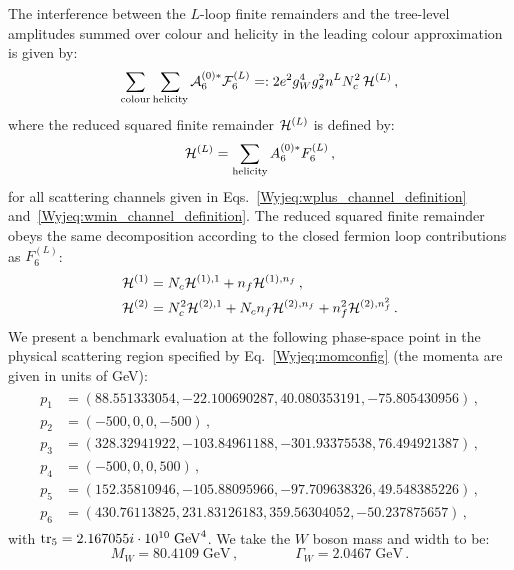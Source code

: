 \documentclass[main.tex]{subfiles}
\begin{document}
The interference between the $L$-loop finite remainders and the tree-level amplitudes summed over colour and helicity in the leading colour approximation is given by:
\begin{equation}
\sum_{\mathrm{colour}}\sum_{\mathrm{helicity}} \mathcal{A}_6^{(0)*} \mathcal{F}_6^{(L)} =: 2 e^2 g_W^4 g_s^2 n^L N_c^2 \, \mathcal{H}^{(L)} \,,
\end{equation}
where the reduced squared finite remainder $\mathcal{H}^{(L)}$ is defined by:
\begin{equation}
\mathcal{H}^{(L)} = \sum_{\mathrm{helicity}}  A_{6}^{(0)*}  F_{6}^{(L)} \,,
\end{equation}
for all scattering channels given in Eqs.~\eqref{Wyjeq:wplus_channel_definition} and~\eqref{Wyjeq:wmin_channel_definition}. 
The reduced squared finite remainder obeys the same decomposition according to the closed fermion loop contributions as $F_{6}^{(L)}$:
\begin{align} \label{Wyjeq:NfDecompositionH} 
\begin{aligned}
& \mathcal{H}^{(1)} = N_c \mathcal{H}^{(1),1} + n_f \mathcal{H}^{(1),n_f} \,, \\
& \mathcal{H}^{(2)} = N_c^2 \mathcal{H}^{(2),1} + N_c n_f \mathcal{H}^{(2),n_f} + n_f^2 \mathcal{H}^{(2),n_f^2} \,.
\end{aligned}
\end{align}
We present a benchmark evaluation at the following phase-space point in the physical scattering region specified by Eq.~\ref{Wyjeq:momconfig} (the momenta are given in units of GeV):
\begin{align}
\label{Wyjeq:PSpoint}
\begin{aligned}
p_1 & = (88.551333054, -22.100690287, 40.080353191, -75.805430956) \,, \\
p_2 & = (-500,0,0,-500) \,,  \\
p_3 & = (328.32941922, -103.84961188, -301.93375538, 76.494921387) \,, \\
p_4 & = (-500,0,0, 500) \,,  \\
p_5 & = (152.35810946, -105.88095966, -97.709638326, 49.548385226)  \,, \\
p_6 & = (430.76113825, 231.83126183, 359.56304052, -50.237875657)   \,, 
\end{aligned}
\end{align}
with $\operatorname{\rm tr}_5 =  2.167055i \cdot 10^{10} \; \mathrm{GeV}^4$. We take the $W$ boson mass and width to be: 
\begin{equation}
M_W = 80.4109 \; \mathrm{GeV} \,, \qquad \qquad \Gamma_W = 2.0467 \; \mathrm{GeV}\,.
\label{Wyjeq:inputparameters}
\end{equation}
\end{document}
